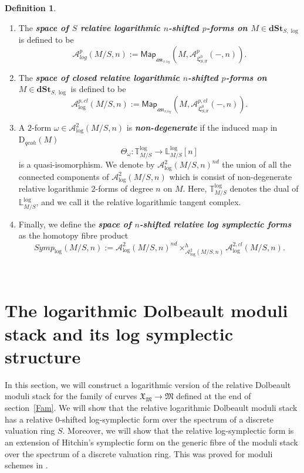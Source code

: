 \documentclass[11pt]{amsart}
\newcommand {\map} {\mathsf{Map}}
\newcommand  {\dSt}   {\mathbf{dSt}}
\theoremstyle{plain}
\numberwithin{equation}{section}
\theoremstyle{definition}
\newtheorem{Def}{Definition}[section]
\theoremstyle{plain}
\begin{document}
\begin{Def}\label{slogsym}
\begin{enumerate}
\item[(1)] The \emph{\bfseries space of $S$ relative logarithmic $n$-shifted \linebreak $p$-forms on $M \in \dSt_{S, \log}$} is defined to be 
\[
\mathcal{A}_{log}^p (M/S, n):=\map_{_{\textbf{dSt}_{S, log}}}\left(M, \boldsymbol{\mathcal A}^p_{\mathfrak L^0_{S, \mathsf{lf}}}(-, n)\right).
\]
\item[(2)] The \emph{\bfseries space of closed relative logarithmic $n$-shifted $p$-forms on \linebreak $M \in \dSt_{S, \log}$} is defined to be  
\[
\mathcal{A}_{\log}^{p,cl} (M/S, n):=\map_{_{\textbf{dSt}_{S, log}}}\left(M, \boldsymbol{\mathcal A}^{p,cl}_{\mathfrak L^0_{S, \mathsf{lf}}}(-, n)\right).
\]
\item[(3)] A $2$-form $\omega\in \mathcal{A}_{\log}^2(M/S,n)$ is \emph{\bfseries non-degenerate} if the induced map in $\mathrm{D}_{qcoh}(M)$
\begin{equation}
\Theta_{\omega}: \mathbb T^{\log}_{M/S}\longrightarrow \mathbb L^{\log}_{M/S}[n]
\end{equation}  
is a quasi-isomorphism. We denote by $\mathcal{A}_{\log}^2 (M/S, n)^{nd}$ the union of all the connected components of  $\mathcal{A}_{\log}^2 (M/S, n)$ which is consist of non-degenerate relative logarithmic $2$-forms of degree $n$ on $M$. Here, $\mathbb T^{\log}_{M/S}$ denotes the dual of $\mathbb L^{\log}_{M/S}$, and we call it the relative logarithmic tangent complex. 

\item[(4)] Finally, we define the \emph{\bfseries space of $n$-shifted relative log symplectic forms} as the homotopy fibre product 
\[
Symp_{\log}(M/S, n):=
\mathcal{A}_{\log}^2 (M/S, n)^{nd}\times^{h}_{\mathcal{A}_{\log}^2 (M/S, n)} \mathcal{A}_{\log}^{2,cl} (M/S, n).
\]
\end{enumerate}
\end{Def}


\


\section{\textbf{The logarithmic Dolbeault moduli stack and its log symplectic structure}}
In this section, we will construct a logarithmic version of the relative Dolbeault moduli stack for the family of curves $\mathfrak X_{\mathfrak M}\rightarrow \mathfrak M$ defined at the end of section~\ref{Fam}. We will show that the relative logarithmic Dolbeault moduli stack has a relative $0$-shifted log-symplectic form over the spectrum of a discrete valuation ring $S$. Moreover, we will show that the relative log-symplectic form is an extension of Hitchin's symplectic form on the generic fibre of the moduli stack over the spectrum of a discrete valuation ring. This was proved for moduli schemes in \cite{D}.
\end{document}
